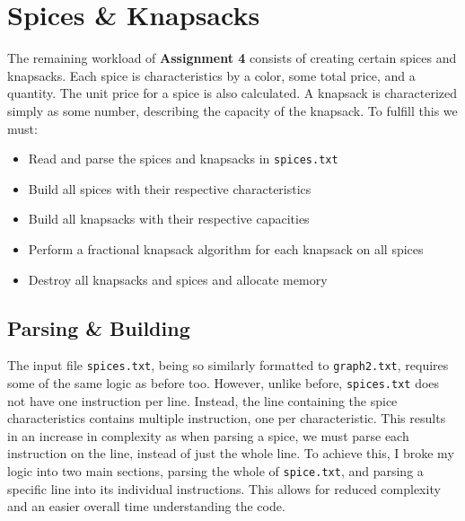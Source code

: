\documentclass[12pt, letterpaper]{article}
\begin{document}
\section{Spices \& Knapsacks} \label{SpiceKnapsack}
The remaining workload of \textbf{Assignment 4} consists of creating certain spices and knapsacks.
Each spice is characteristics by a color, some total price, and a quantity.
The unit price for a spice is also calculated.
A knapsack is characterized simply as some number, describing the capacity of the knapsack.
\vspace*{5px}
\newline
To fulfill this we must:
\begin{itemize}
   \item Read and parse the spices and knapsacks in \texttt{spices.txt}
   \item Build all spices with their respective characteristics
   \item Build all knapsacks with their respective capacities
   \item Perform a fractional knapsack algorithm for each knapsack on all spices
   \item Destroy all knapsacks and spices and allocate memory
\end{itemize}

\subsection{Parsing \& Building} \label{SpiceKnapsack_ParseBuild}
The input file \texttt{spices.txt}, being so similarly formatted to \texttt{graph2.txt}, requires some of the same logic as before too.
However, unlike before, \texttt{spices.txt} does not have one instruction per line.
Instead, the line containing the spice characteristics contains multiple instruction, one per characteristic.
This results in an increase in complexity as when parsing a spice, we must parse each instruction on the line, instead of just the whole line.
\vspace*{5px}
\newline
To achieve this, I broke my logic into two main sections, parsing the whole of \texttt{spice.txt}, and parsing a specific line into its individual instructions.
This allows for reduced complexity and an easier overall time understanding the code.
\end{document}
